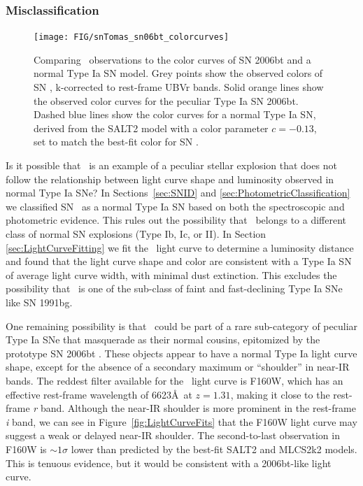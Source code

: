 \subsubsection{Misclassification}
\label{sec:Misclassification}

\begin{figure}
\begin{center}
\texttt{[image: FIG/snTomas\_sn06bt\_colorcurves]}
\caption{ 
Comparing \tomas\ observations to the color curves of SN 2006bt and a
normal Type Ia SN model. Grey points show the observed colors of
SN \tomas, k-corrected to rest-frame UBVr bands. Solid orange lines
show the observed color curves for the peculiar Type Ia SN
2006bt. Dashed blue lines show the color curves for a normal Type Ia
SN, derived from the SALT2 model with a color parameter $c=-0.13$, set
to match the best-fit color for SN \tomas.
\label{fig:colorcomparison} }
\end{center}
\end{figure}

Is it possible that \tomas\ is an example of a peculiar stellar
explosion that does not follow the relationship between light curve
shape and luminosity observed in normal Type Ia SNe?  In
Sections~\ref{sec:SNID} and \ref{sec:PhotometricClassification} we
classified SN \tomas\ as a normal Type Ia SN based on both the
spectroscopic and photometric evidence.  This rules out the
possibility that \tomas\ belongs to a different class of normal SN
explosions (Type Ib, Ic, or II). In
Section \ref{sec:LightCurveFitting} we fit the \tomas\ light curve to
determine a luminosity distance and found that the light curve shape
and color are consistent with a Type Ia SN of average light curve
width, with minimal dust extinction.  This excludes the possibility
that \tomas\ is one of the sub-class of faint and fast-declining Type
Ia SNe like SN 1991bg.

One remaining possibility is that \tomas\ could be part of a rare
sub-category of peculiar Type Ia SNe that masquerade as their normal
cousins, epitomized by the prototype SN 2006bt \citep{Foley:2010}.
These objects appear to have a normal Type Ia light curve shape,
except for the absence of a secondary maximum or ``shoulder'' in
near-IR bands.  The reddest filter available for the \tomas\ light
curve is F160W, which has an effective rest-frame wavelength of
6623\AA\ at $z=1.31$, making it close to the rest-frame {\it r} band.
Although the near-IR shoulder is more prominent in the rest-frame {\it
i} band, we can see in Figure~\ref{fig:LightCurveFits} that the F160W
light curve may suggest a weak or delayed near-IR shoulder.  The
second-to-last observation in F160W is $\sim1\sigma$ lower than
predicted by the best-fit SALT2 and MLCS2k2 models. This is tenuous
evidence, but it would be consistent with a 2006bt-like light curve.

